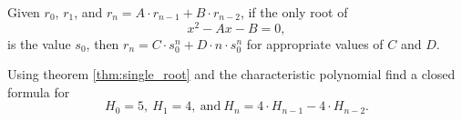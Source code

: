 \clearpage

\begin{thm}\label{thm:single_root}
Given \(r_0\), \(r_1\), and \(r_n=A\cdot r_{n-1}+B\cdot r_{n-2}\), if the only root of
    \[x^2-Ax-B=0,\]
is the value \(s_0\), then \(r_n=C\cdot s_0^n + D\cdot n\cdot s_0^n\) for appropriate values of \(C\) and \(D\).
\end{thm}


\begin{practiceprob}
Using theorem \ref{thm:single_root} and the characteristic polynomial find a closed formula for \[H_0=5,\ H_1=4,\ \text{and}\ H_n=4\cdot H_{n-1}-4\cdot H_{n-2}.\]
\vspace{0.73\textheight}
\end{practiceprob}
